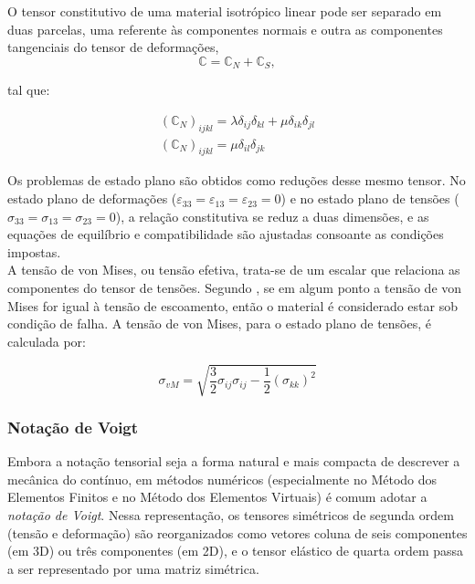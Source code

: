 \indent O tensor constitutivo de uma material isotrópico linear pode ser separado em duas parcelas, uma referente às componentes normais e outra as componentes tangenciais do tensor de deformações,
\begin{equation} 
    \mathbb{C} = \mathbb{C}_N + \mathbb{C}_S,
    \label{eq:3.a1}
\end{equation} 

\noindent tal que:

\begin{equation*}
    \begin{aligned}
        (\mathbb{C}_N)_{ijkl} = \lambda \delta_{ij} \delta_{kl} + \mu \delta_{ik} \delta_{jl} \\
        (\mathbb{C}_N)_{ijkl} = \mu \delta_{il} \delta_{jk}
    \end{aligned}
\end{equation*}

\indent Os problemas de estado plano são obtidos como reduções desse mesmo tensor. No estado plano de deformações (\(\varepsilon_{33}=\varepsilon_{13}=\varepsilon_{23}=0\)) e no estado plano de tensões (\(\sigma_{33}=\sigma_{13}=\sigma_{23}=0\)), a relação constitutiva se reduz a duas dimensões, e as equações de equilíbrio e compatibilidade são ajustadas consoante as condições impostas.\\
\indent A tensão de von Mises, ou tensão efetiva, trata-se de um escalar que relaciona as componentes do tensor de tensões. Segundo \citet{elasticitytheoryapplicationsnumerics2021}, se em algum ponto a tensão de von Mises for igual à tensão de escoamento, então o material é considerado estar sob condição de falha. A tensão de von Mises, para o estado plano de tensões, é calculada por: 

\begin{equation}
    \sigma_{vM} = \sqrt{\frac{3}{2} \sigma_{ij}\sigma_{ij} - \frac{1}{2}(\sigma_{kk})^2}
    \label{eq:3.vm}
\end{equation}


\subsubsection{Notação de Voigt}

\indent Embora a notação tensorial seja a forma natural e mais compacta de descrever a mecânica do contínuo, em métodos numéricos (especialmente no Método dos Elementos Finitos e no Método dos Elementos Virtuais) é comum adotar a \emph{notação de Voigt}. Nessa representação, os tensores simétricos de segunda ordem (tensão e deformação) são reorganizados como vetores coluna de seis componentes (em 3D) ou três componentes (em 2D), e o tensor elástico de quarta ordem passa a ser representado por uma matriz simétrica.

